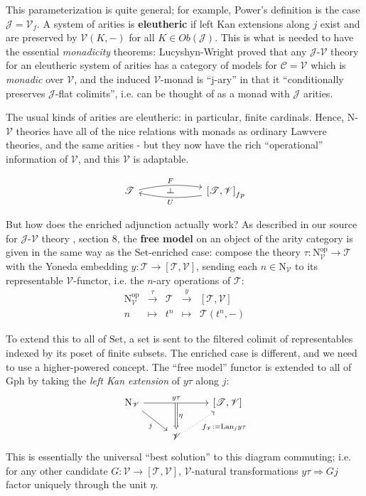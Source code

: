 \documentclass[a4paper,UKenglish]{article}
\theoremstyle{definition}
\def\ld{\rotatebox[origin=c]{-90}{$\dashv$}} %
\newcommand{\Gph}{\mathrm{Gph}}
\newcommand{\Set}{\mathrm{Set}}
\newcommand{\op}{\mathrm{op}}
\newcommand{\NN}{\mathrm{N}}
\newcommand{\V}{\mathscr{V}}
\newcommand{\C}{\mathscr{C}}
\newcommand{\J}{\mathscr{J}}
\newcommand{\T}{\mathscr{T}}
\begin{document}
This parameterization is quite general; for example, Power's definition is the case $\J = \V_f$. A system of arities is \textbf{eleutheric} if left Kan extensions along $j$ exist and are preserved by $\V(K,-)$ for all $K \in Ob(\J)$. This is what is needed to have the essential \textit{monadicity} theorems: Lucyshyn-Wright proved that any $\J$-$\V$ theory for an eleutheric system of arities has a category of models for $\C = \V$ which is \textit{monadic} over $\V$, and the induced $\V$-monad is ``j-ary'' in that it ``conditionally preserves $\J$-flat colimits'', i.e. can be thought of as a monad with $\J$ arities.

The usual kinds of arities are eleutheric: in particular, finite cardinals. Hence, $\NN$-$\V$ theories have all of the nice relations with monads as ordinary Lawvere theories, and the same arities - but they now have the rich ``operational'' information of $\V$, and this $\V$ is adaptable.

\[\begin{tikzcd}
\T \arrow[bend left=10,below]{rr}{F}
& \ld &
\arrow[bend left=10,above]{ll}{U} \left[\T,\V\right]_{fp}
\end{tikzcd}\]

But how does the enriched adjunction actually work? As described in our source for $\J$-$\V$ theory \cite{rbb}, section 8, the \textbf{free model} on an object of the arity category is given in the same way as the $\Set$-enriched case: compose the theory $\tau: \NN_\V^\op \to \T$ with the Yoneda embedding $y: \T \to [\T,\V]$, sending each $n \in \NN_\V$ to its representable $\V$-functor, i.e. the $n$-ary operations of $\T$:
\[\begin{array}{rllll}
\NN_\V^\op & \xrightarrow{\tau} & \T & \xrightarrow{y} & \left[\T,\V\right]\\
n & \mapsto & t^n & \mapsto & \T(t^n,-)
\end{array}\]

To extend this to all of $\Set$, a set is sent to the filtered colimit of representables indexed by its poset of finite subsets. The enriched case is different, and we need to use a higher-powered concept. The ``free model'' functor is extended to all of $\Gph$ by taking the \textit{left Kan extension} of $y\tau$ along $j$:
\[\begin{tikzcd}
\NN_\V \arrow[rr,"y\tau"{name=y}] \arrow[swap,rd,"j"] & & \left[\T,\V\right]\\
& \V \arrow[swap,dotted, ru,"f_\V:=\mathrm{Lan}_jy\tau"] \arrow[Rightarrow,from=y,"\eta"] &
\end{tikzcd}\]
This is essentially the universal ``best solution'' to this diagram commuting; i.e. for any other candidate $G: \V \to [\T,\V]$, $\V$-natural transformations $y\tau \Rightarrow Gj$ factor uniquely through the unit $\eta$.
\end{document}
